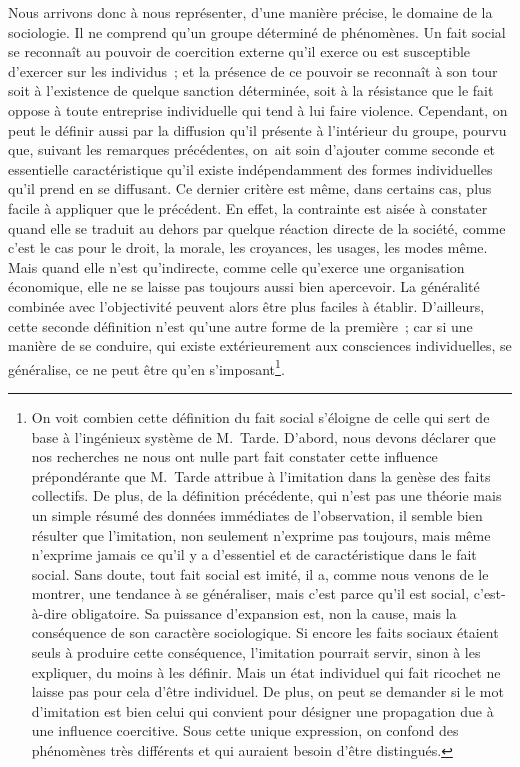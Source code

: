 \documentclass[french,twoside]{book} %
\begin{document}
Nous arrivons donc à nous représenter, d’une manière précise, le domaine de la sociologie. Il ne comprend qu’un groupe déterminé de phénomènes. Un fait social se reconnaît au pouvoir de coercition externe qu’il exerce ou est susceptible d’exercer sur les individus ; et la présence de ce pouvoir se reconnaît à son tour soit à l’existence de quelque sanction déterminée, soit à la résistance que le fait oppose à toute entreprise individuelle qui tend à lui faire violence. Cependant, on peut le définir aussi par la diffusion qu’il présente à l’intérieur du groupe, pourvu que, suivant les remarques précédentes, on ait soin d’ajouter comme seconde et essentielle caractéristique qu’il existe indépendamment des formes individuelles qu’il prend en se diffusant. Ce dernier critère est même, dans certains cas, plus facile à appliquer que le précédent. En effet, la contrainte est aisée à constater quand elle se traduit au dehors par quelque réaction directe de la société, comme c’est le cas pour le droit, la morale, les croyances, les usages, les modes même. Mais quand elle n’est qu’indirecte, comme celle qu’exerce une organisation économique, elle ne se laisse pas toujours aussi bien apercevoir. La généralité combinée avec l’objectivité peuvent alors être plus faciles à établir. D’ailleurs, cette seconde définition n’est qu’une autre forme de la première ; car si une manière de se conduire, qui existe extérieurement aux consciences individuelles, se généralise, ce ne peut être qu’en s’imposant\footnote{ On voit combien cette définition du fait social s’éloigne de celle qui sert de base à l’ingénieux système de M. Tarde. D’abord, nous devons déclarer que nos recherches ne nous ont nulle part fait constater cette influence prépondérante que M. Tarde attribue à l’imitation dans la genèse des faits collectifs. De plus, de la définition précédente, qui n’est pas une théorie mais un simple résumé des données immédiates de l’observation, il semble bien résulter que l’imitation, non seulement n’exprime pas toujours, mais même n’exprime jamais ce qu’il y a d’essentiel et de caractéristique dans le fait social. Sans doute, tout fait social est imité, il a, comme nous venons de le montrer, une tendance à se généraliser, mais c’est parce qu’il est social, c’est-à-dire obligatoire. Sa puissance d’expansion est, non la cause, mais la conséquence de son caractère sociologique. Si encore les faits sociaux étaient seuls à produire cette conséquence, l’imitation pourrait servir, sinon à les expliquer, du moins à les définir. Mais un état individuel qui fait ricochet ne laisse pas pour cela d’être individuel. De plus, on peut se demander si le mot d’imitation est bien celui qui convient pour désigner une propagation due à une influence coercitive. Sous cette unique expression, on confond des phénomènes très différents et qui auraient besoin d’être distingués.}.\par
\end{document}

